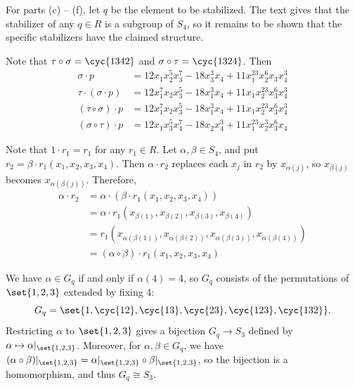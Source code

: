 \begin{sol}
    For parts (c) -- (f), let $q$ be the element to be stabilized.
    The text gives that the stabilizer of any $q \in R$ is a subgroup of $S_4$, so it remains to be shown that the specific stabilizers have the claimed structure.
    \begin{subexercises}
        \item Note that $\tau \circ \sigma = \cyc{1 3 4 2}$ and $\sigma \circ \tau = \cyc{1 3 2 4}$.
        Then
        \begin{align*}
            \sigma \cdot p & = 12x_1x_2^5x_3^7 - 18x_3^3x_4 + 11x_1^{23}x_2^6x_3x_4^3 \\
            \tau \cdot (\sigma \cdot p) & = 12x_1^7x_2x_3^5 - 18x_1^3x_4 + 11x_1x_2^{23}x_3^6x_4^3 \\
            (\tau \circ \sigma) \cdot p & = 12x_1^7x_2x_3^5 - 18x_1^3x_4 + 11x_1x_2^{23}x_3^6x_4^3  \\
            (\sigma \circ \tau) \cdot p & = 12x_1x_3^5x_4^7 - 18x_2x_4^3 + 11x_1^{23}x_2^3x_3^6x_4
        \end{align*}
        \item Note that $1 \cdot r_1 = r_1$ for any $r_1 \in R$.
        Let $\alpha, \beta \in S_4$, and put $r_2 = \beta \cdot r_1(x_1, x_2, x_3, x_4)$.
        Then $\alpha \cdot r_2$ replaces each $x_j$ in $r_2$ by $x_{\alpha(j)}$, so $x_{\beta(j)}$ becomes $x_{\alpha(\beta(j))}$.
        Therefore,
        \begin{align*}
            \alpha \cdot r_2 & = \alpha \cdot (\beta \cdot r_1(x_1, x_2, x_3, x_4)) \\
            & = \alpha \cdot r_1(x_{\beta(1)}, x_{\beta(2)}, x_{\beta(3)}, x_{\beta(4)}) \\
            & = r_1(x_{\alpha(\beta(1))}, x_{\alpha(\beta(2))}, x_{\alpha(\beta(3))}, x_{\alpha(\beta(4))}) \\
            & = (\alpha \circ \beta) \cdot r_1(x_1, x_2, x_3, x_4)
        \end{align*}
        \item We have $\alpha \in G_q$ if and only if $\alpha(4) = 4$, so $G_q$ consists of the permutations of $\set{1, 2, 3}$ extended by fixing 4:
        \[
            G_q = \set{1, \cyc{1 2}, \cyc{1 3}, \cyc{2 3}, \cyc{1 2 3}, \cyc{1 3 2}}.
        \]
        Restricting $\alpha$ to $\set{1, 2, 3}$ gives a bijection $G_q \to S_3$ defined by $\alpha \mapsto \alpha|_{\set{1, 2, 3}}$.
        Moreover, for $\alpha, \beta \in G_q$, we have $(\alpha \circ \beta)|_{\set{1, 2, 3}} = \alpha|_{\set{1, 2, 3}} \circ \beta|_{\set{1, 2, 3}}$, so the bijection is a homomorphism, and thus $G_q \cong S_3$.

\end{subexercises}
\end{sol}
